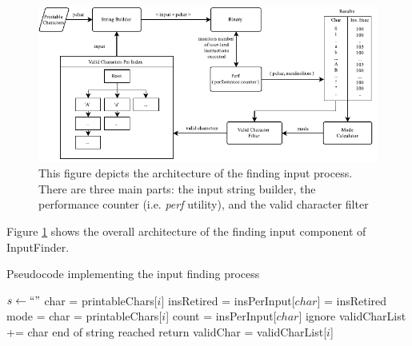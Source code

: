 \documentclass{sig-alternate-05-2015}
\def \tool {InputFinder}
\begin{document}
\begin{figure}[t]
\centering
\includegraphics[width=\textwidth]{architecture.pdf}
\caption{This figure depicts the architecture of the finding input process. There are three main parts: the input string builder, the performance counter (i.e. \textit{perf} utility), and the valid character filter}
\label{fig:architecture}
\end{figure}

Figure \ref{fig:architecture} shows the overall architecture of the finding input component of \tool{}.

\begin{algorithm}
\caption{Pseudocode implementing the input finding process}
\label{findinputcode}
\begin{algorithmic}[1]
\State $s \leftarrow ``"$ 
\State char = printableChars[$i$]
\State insRetired =  \label{execute}%
\State insPerInput[$char$] = insRetired %
\EndFor
\State mode =  \label{mode}%
 \label{filterbegin}%
\State char = printableChars[$i$]
\State count = insPerInput[$char$]
\State ignore
\Else
\State validCharList += char
\EndIf
\EndFor \label{filterend}
\State end of string reached
\State return
\Else
{} \label{fork}
\State validChar = validCharList[$i$]
\State {}
\EndFor
\EndIf
\EndProcedure
\end{algorithmic}
\end{algorithm}
\end{document}
